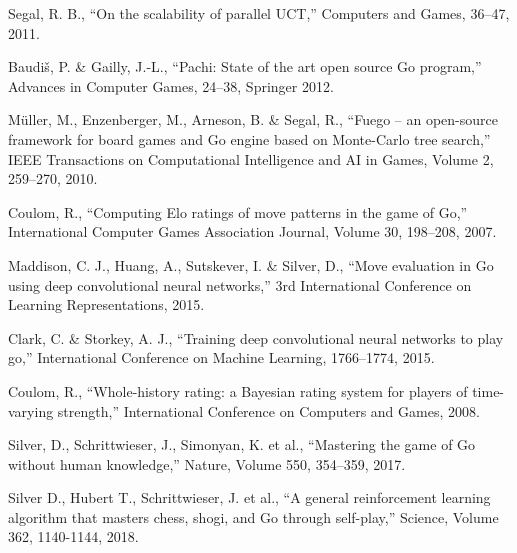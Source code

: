 \documentclass[conference]{IEEEtran}
\begin{document}
\begin{thebibliography}{}
 Segal, R. B., ``On the scalability of parallel UCT,'' Computers and Games, 36–47, 2011.

 Baudiš, P. \& Gailly, J.-L., ``Pachi: State of the art open source Go program,'' Advances in Computer Games, 24–38, Springer 2012.

 Müller, M., Enzenberger, M., Arneson, B. \& Segal, R., ``Fuego – an open-source framework for board games and Go engine based on Monte-Carlo tree search,''
IEEE Transactions on Computational Intelligence and AI in Games, Volume 2, 259–270, 2010.

 Coulom, R., ``Computing Elo ratings of move patterns in the game of Go,'' International Computer Games Association Journal, Volume 30, 198–208, 2007.

 Maddison, C. J., Huang, A., Sutskever, I. \& Silver, D., ``Move evaluation in Go using deep convolutional neural networks,'' 3rd International Conference on Learning
Representations, 2015.

 Clark, C. \& Storkey, A. J., ``Training deep convolutional neural networks to play go,'' International Conference on Machine Learning, 1766–1774, 2015.

 Coulom, R., ``Whole-history rating: a Bayesian rating system for players of time-varying strength,'' International Conference on Computers and Games, 2008.

 Silver, D., Schrittwieser, J., Simonyan, K. et al., ``Mastering the game of Go without human knowledge,'' Nature, Volume 550, 354–359, 2017.

 Silver D., Hubert T., Schrittwieser, J. et al., ``A general reinforcement learning algorithm that masters chess, shogi, and Go through self-play,'' Science, Volume 362, 1140-1144, 2018.

\end{thebibliography}
\end{document}
